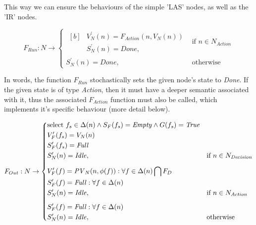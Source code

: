 \begin{definition}
This way we can ensure the behaviours of the simple 'LAS' nodes, as well as the 'IR' nodes.

\begin{equation}
	F_{Run} : N \rightarrow
	\begin{cases}
		\begin{aligned}[b]
			&V_N^\prime(n) = F_{Action}(n, V_N(n)) \\
			&S_N^\prime(n) = \mathit{Done},
		\end{aligned} & \text{if } n \in N_{Action} \\[8pt]
		S_N^\prime(n) = \mathit{Done}, & \text{otherwise}
	\end{cases}
\end{equation}

In words, the function \(F_{Run}\) stochastically sets the given node's state to \emph{Done}. If the given state is of type \emph{Action}, then it must have a deeper semantic associated with it, thus the associated \(F_{Action}\) function must also be called, which implements it's specific behaviour (more detail below).

\begin{equation}
	F_{Out} : N \rightarrow
	\begin{cases}
		\begin{aligned}[b]
			&\text{select } f_s \in \Delta(n) \wedge S_F(f_s) = \mathit{Empty} \wedge G(f_s) = \mathit{True} \\
			&V_F^\prime(f_s) = V_N(n) \\
			&S_F^\prime(f_s) = \mathit{Full} \\
			&S_N^\prime(n) = \mathit{Idle},
		\end{aligned} & \text{if } n \in N_\mathit{Decision} \\[8pt]
		\begin{aligned}[b]
			&V_F^\prime(f) = \mathit{PV}_N(n, \phi(f)) : \forall f \in \Delta(n) \bigcap F_D \\
			&S_F^\prime(f) = \mathit{Full} : \forall f \in \Delta(n) \\
			&S_N^\prime(n) = \mathit{Idle},
		\end{aligned} & \text{if } n \in N_\mathit{Action} \\[8pt]
		\begin{aligned}[b]
			&S_F^\prime(f) = \mathit{Full} : \forall f \in \Delta(n) \\
			&S_N^\prime(n) = \mathit{Idle},
		\end{aligned} & \text{otherwise}
	\end{cases}
\end{equation}


\end{definition}
